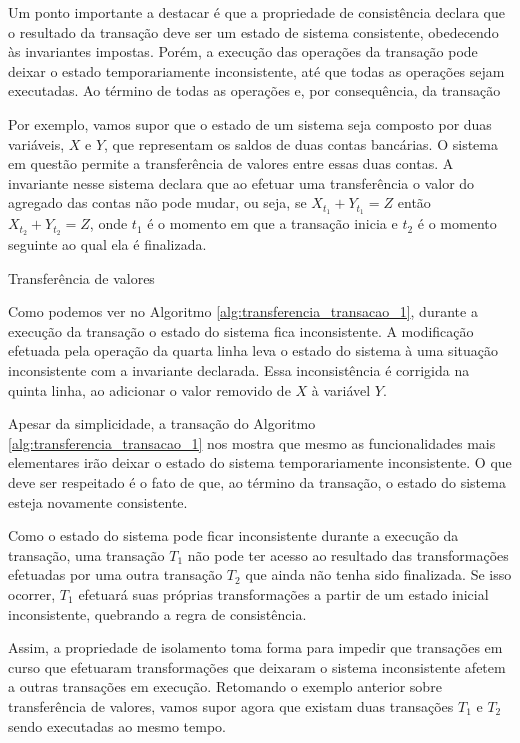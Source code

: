\documentclass[11pt,twoside,a4paper]{book}
\begin{document}
Um ponto importante a destacar é que a propriedade de consistência declara que o resultado da transação deve ser um estado de sistema consistente, obedecendo às invariantes impostas. Porém, a execução das operações da transação pode deixar o estado temporariamente inconsistente, até que todas as operações sejam executadas. Ao término de todas as operações e, por consequência, da transação

Por exemplo, vamos supor que o estado de um sistema seja composto por duas variáveis, $X$ e $Y$, que representam os saldos de duas contas bancárias. O sistema em questão permite a transferência de valores entre essas duas contas. A invariante nesse sistema declara que ao efetuar uma transferência o valor do agregado das contas não pode mudar, ou seja, se $X_{t_1} + Y_{t_1} = Z$ então $X_{t_2} + Y_{t_2} = Z$, onde $t_1$ é o momento em que a transação inicia e $t_2$ é o momento seguinte ao qual ela é finalizada.

\begin{algorithm}
\caption{Transferência de valores}
\label{alg:transferencia_transacao_1}
\end{algorithm}

Como podemos ver no Algoritmo \ref{alg:transferencia_transacao_1}, durante a execução da transação o estado do sistema fica inconsistente. A modificação efetuada pela operação da quarta linha leva o estado do sistema à uma situação inconsistente com a invariante declarada. Essa inconsistência é corrigida na quinta linha, ao adicionar o valor removido de $X$ à variável $Y$.

Apesar da simplicidade, a transação do Algoritmo \ref{alg:transferencia_transacao_1} nos mostra que mesmo as funcionalidades mais elementares irão deixar o estado do sistema temporariamente inconsistente. O que deve ser respeitado é o fato de que, ao término da transação, o estado do sistema esteja novamente consistente.

Como o estado do sistema pode ficar inconsistente durante a execução da transação, uma transação $T_1$ não pode ter acesso ao resultado das transformações efetuadas por uma outra transação $T_2$ que ainda não tenha sido finalizada. Se isso ocorrer, $T_1$ efetuará  suas próprias transformações a partir de um estado inicial inconsistente, quebrando a regra de consistência.

Assim, a propriedade de isolamento toma forma para impedir que transações em curso que efetuaram transformações que deixaram o sistema inconsistente afetem a outras transações em execução. Retomando o exemplo anterior sobre transferência de valores, vamos supor agora que existam duas transações $T_1$ e $T_2$ sendo executadas ao mesmo tempo.
\end{document}
